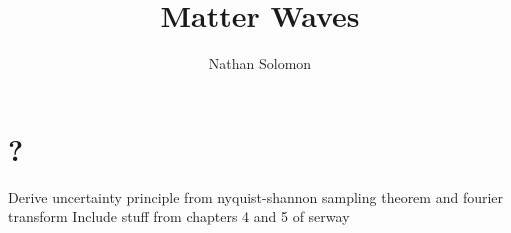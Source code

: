 \documentclass[12pt]{article}
\begin{document}
\title{Matter Waves}
\author{Nathan Solomon}
\maketitle

\section{?}

Derive uncertainty principle from nyquist-shannon sampling theorem and fourier transform
Include stuff from chapters 4 and 5 of serway
\end{document}
